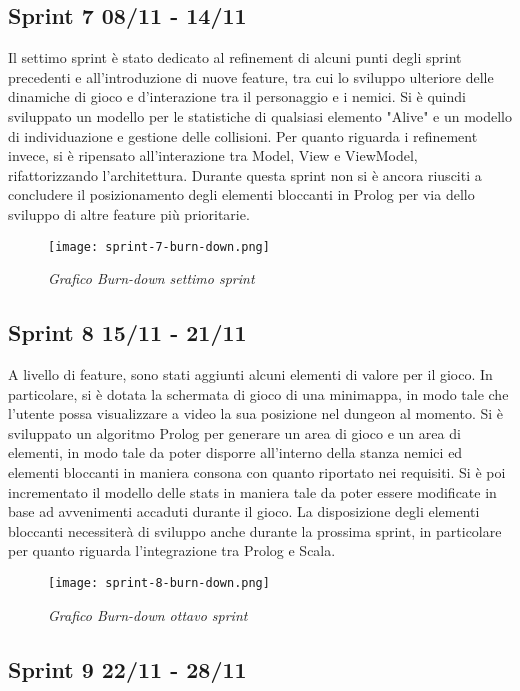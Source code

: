 \subsection{Sprint 7 08/11 - 14/11}
Il settimo sprint è stato dedicato al refinement di alcuni punti degli sprint precedenti e all'introduzione di nuove feature, tra cui lo sviluppo ulteriore delle dinamiche di gioco e d'interazione tra il personaggio e i nemici. 
Si è quindi sviluppato un modello per le statistiche di qualsiasi elemento "Alive" e un modello di individuazione e gestione delle collisioni. 
Per quanto riguarda i refinement invece, si è ripensato all'interazione tra Model, View e ViewModel, rifattorizzando l'architettura. 
Durante questa sprint non si è ancora riusciti a concludere il posizionamento degli elementi bloccanti in Prolog per via dello sviluppo di altre feature più prioritarie.
\begin{figure}[!hbt]
    \centering
    \texttt{[image: sprint-7-burn-down.png]}
    \caption{\textit{Grafico Burn-down settimo sprint}} 
\end{figure}


\subsection{Sprint 8 15/11 - 21/11}
A livello di feature, sono stati aggiunti alcuni elementi di valore per il gioco. 
In particolare, si è dotata la schermata di gioco di una minimappa, in modo tale che l'utente possa visualizzare a video la sua posizione nel dungeon al momento. 
Si è sviluppato un algoritmo Prolog per generare un area di gioco e un area di elementi, 
in modo tale da poter disporre all'interno della stanza nemici ed elementi bloccanti in maniera consona con quanto riportato nei requisiti.
Si è poi incrementato il modello delle stats in maniera tale da poter essere modificate in base ad avvenimenti accaduti durante il gioco. 
La disposizione degli elementi bloccanti necessiterà di sviluppo anche durante la prossima sprint, in particolare per quanto riguarda l'integrazione tra Prolog e Scala. 
\begin{figure}[!hbt]
    \centering
    \texttt{[image: sprint-8-burn-down.png]}
    \caption{\textit{Grafico Burn-down ottavo sprint}} 
\end{figure}

\subsection{Sprint 9 22/11 - 28/11}